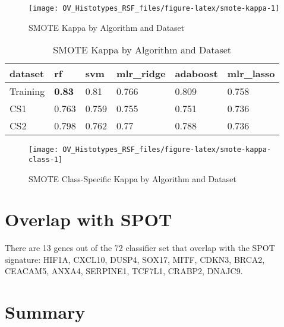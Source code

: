\documentclass[
]{report}
\begin{document}
\begin{figure}[H]

{\centering \texttt{[image: OV\_Histotypes\_RSF\_files/figure-latex/smote-kappa-1]} 

}

\caption{SMOTE Kappa by Algorithm and Dataset}\label{fig:smote-kappa}
\end{figure}

\begin{table}

\caption{\label{tab:smote-kappa-table}SMOTE Kappa by Algorithm and Dataset}
\centering
\begin{tabular}[t]{l|l|l|l|l|l}
\hline
dataset & rf & svm & mlr\_ridge & adaboost & mlr\_lasso\\
\hline
Training & \textbf{0.83} & 0.81 & 0.766 & 0.809 & 0.758\\
\hline
CS1 & 0.763 & 0.759 & 0.755 & 0.751 & 0.736\\
\hline
CS2 & 0.798 & 0.762 & 0.77 & 0.788 & 0.736\\
\hline
\end{tabular}
\end{table}

\begin{figure}[H]

{\centering \texttt{[image: OV\_Histotypes\_RSF\_files/figure-latex/smote-kappa-class-1]} 

}

\caption{SMOTE Class-Specific Kappa by Algorithm and Dataset}\label{fig:smote-kappa-class}
\end{figure}

\hypertarget{overlap-with-spot}{%
\section{Overlap with SPOT}\label{overlap-with-spot}}

There are 13 genes out of the 72 classifier set that overlap with the SPOT signature: HIF1A, CXCL10, DUSP4, SOX17, MITF, CDKN3, BRCA2, CEACAM5, ANXA4, SERPINE1, TCF7L1, CRABP2, DNAJC9.

\hypertarget{summary}{%
\section{Summary}\label{summary}}
\end{document}
